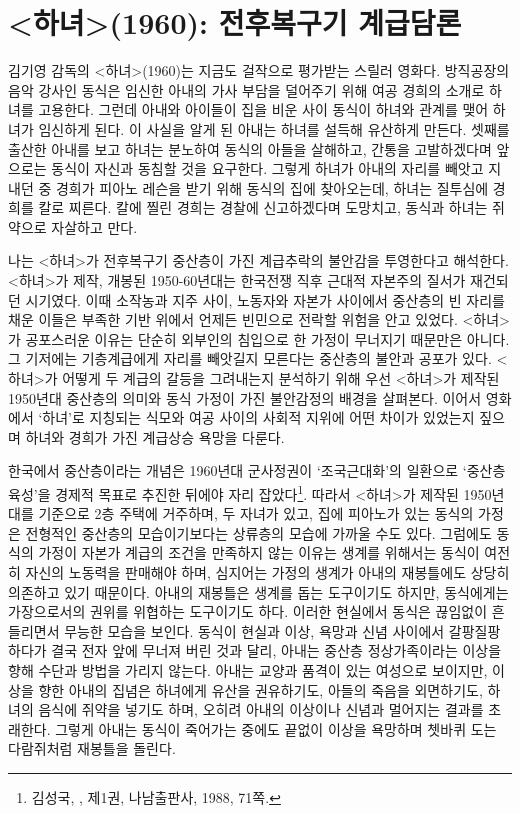 \section*{<하녀>(1960): 전후복구기 계급담론}

김기영 감독의 <하녀>(1960)는 지금도 걸작으로 평가받는 스릴러 영화다. 방직공장의 음악 강사인 동식은 임신한 아내의 가사 부담을 덜어주기 위해 여공 경희의 소개로 하녀를 고용한다. 그런데 아내와 아이들이 집을 비운 사이 동식이 하녀와 관계를 맺어 하녀가 임신하게 된다. 이 사실을 알게 된 아내는 하녀를 설득해 유산하게 만든다. 셋째를 출산한 아내를 보고 하녀는 분노하여 동식의 아들을 살해하고, 간통을 고발하겠다며 앞으로는 동식이 자신과 동침할 것을 요구한다. 그렇게 하녀가 아내의 자리를 빼앗고 지내던 중 경희가 피아노 레슨을 받기 위해 동식의 집에 찾아오는데, 하녀는 질투심에 경희를 칼로 찌른다. 칼에 찔린 경희는 경찰에 신고하겠다며 도망치고, 동식과 하녀는 쥐약으로 자살하고 만다.

나는 <하녀>가 전후복구기 중산층이 가진 계급추락의 불안감을 투영한다고 해석한다. <하녀>가 제작, 개봉된 1950-60년대는 한국전쟁 직후 근대적 자본주의 질서가 재건되던 시기였다. 이때 소작농과 지주 사이, 노동자와 자본가 사이에서 중산층의 빈 자리를 채운 이들은 부족한 기반 위에서 언제든 빈민으로 전락할 위험을 안고 있었다. <하녀>가 공포스러운 이유는 단순히 외부인의 침입으로 한 가정이 무너지기 때문만은 아니다. 그 기저에는 기층계급에게 자리를 빼앗길지 모른다는 중산층의 불안과 공포가 있다. <하녀>가 어떻게 두 계급의 갈등을 그려내는지 분석하기 위해 우선 <하녀>가 제작된 1950년대 중산층의 의미와 동식 가정이 가진 불안감정의 배경을 살펴본다. 이어서 영화에서 `하녀'로 지칭되는 식모와 여공 사이의 사회적 지위에 어떤 차이가 있었는지 짚으며 하녀와 경희가 가진 계급상승 욕망을 다룬다.

한국에서 중산층이라는 개념은 1960년대 군사정권이 `조국근대화'의 일환으로 `중산층 육성'을 경제적 목표로 추진한 뒤에야 자리 잡았다\footnote{김성국, ,  제1권, 나남출판사, 1988, 71쪽.}. 따라서 <하녀>가 제작된 1950년대를 기준으로 2층 주택에 거주하며, 두 자녀가 있고, 집에 피아노가 있는 동식의 가정은 전형적인 중산층의 모습이기보다는 상류층의 모습에 가까울 수도 있다. 그럼에도 동식의 가정이 자본가 계급의 조건을 만족하지 않는 이유는 생계를 위해서는 동식이 여전히 자신의 노동력을 판매해야 하며, 심지어는 가정의 생계가 아내의 재봉틀에도 상당히 의존하고 있기 때문이다. 아내의 재봉틀은 생계를 돕는 도구이기도 하지만, 동식에게는 가장으로서의 권위를 위협하는 도구이기도 하다. 이러한 현실에서 동식은 끊임없이 흔들리면서 무능한 모습을 보인다. 동식이 현실과 이상, 욕망과 신념 사이에서 갈팡질팡하다가 결국 전자 앞에 무너져 버린 것과 달리, 아내는 중산층 정상가족이라는 이상을 향해 수단과 방법을 가리지 않는다. 아내는 교양과 품격이 있는 여성으로 보이지만, 이상을 향한 아내의 집념은 하녀에게 유산을 권유하기도, 아들의 죽음을 외면하기도, 하녀의 음식에 쥐약을 넣기도 하며, 오히려 아내의 이상이나 신념과 멀어지는 결과를 초래한다. 그렇게 아내는 동식이 죽어가는 중에도 끝없이 이상을 욕망하며 쳇바퀴 도는 다람쥐처럼 재봉틀을 돌린다.

